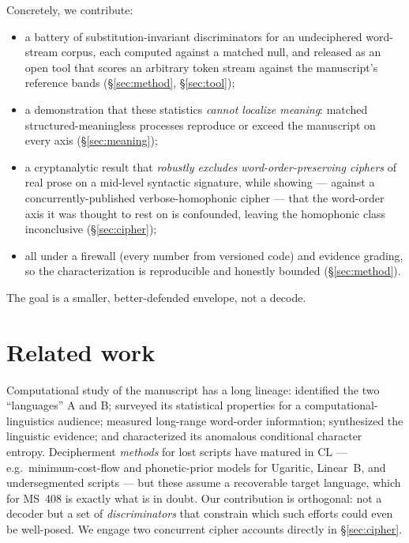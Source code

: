 \documentclass[11pt]{article}
\begin{document}
Concretely, we contribute:
\begin{itemize}[leftmargin=1.2em,itemsep=1pt]
  \item a battery of substitution-invariant discriminators for an undeciphered word-stream
  corpus, each computed against a matched null, and released as an open tool that scores an
  arbitrary token stream against the manuscript's reference bands (\S\ref{sec:method},
  \S\ref{sec:tool});
  \item a demonstration that these statistics \emph{cannot localize meaning}: matched
  structured-meaningless processes reproduce or exceed the manuscript on every axis
  (\S\ref{sec:meaning});
  \item a cryptanalytic result that \emph{robustly excludes word-order-preserving ciphers} of
  real prose on a mid-level syntactic signature, while showing --- against a
  concurrently-published verbose-homophonic cipher --- that the word-order axis it was thought
  to rest on is confounded, leaving the homophonic class inconclusive (\S\ref{sec:cipher});
  \item all under a firewall (every number from versioned code) and evidence grading, so the
  characterization is reproducible and honestly bounded (\S\ref{sec:method}).
\end{itemize}
The goal is a smaller, better-defended envelope, not a decode.

\section{Related work}
Computational study of the manuscript has a long lineage: \citet{currier1976} identified the
two ``languages'' A and B; \citet{reddy2011know} surveyed its statistical properties for a
computational-linguistics audience; \citet{montemurro2013keywords} measured long-range
word-order information; \citet{bowern2021linguistics} synthesized the linguistic evidence; and
\citet{lindemann2022entropy} characterized its anomalous conditional character entropy.
Decipherment \emph{methods} for lost scripts have matured in CL --- e.g.\ minimum-cost-flow and
phonetic-prior models for Ugaritic, Linear~B, and undersegmented scripts
\citep{luo2019neural,luo2021deciphering} --- but these assume a recoverable target language,
which for MS~408 is exactly what is in doubt. Our contribution is orthogonal: not a decoder but
a set of \emph{discriminators} that constrain which such efforts could even be well-posed. We
engage two concurrent cipher accounts \citep{greshko2025naibbe,parisel2026layered} directly in
\S\ref{sec:cipher}.
\end{document}
